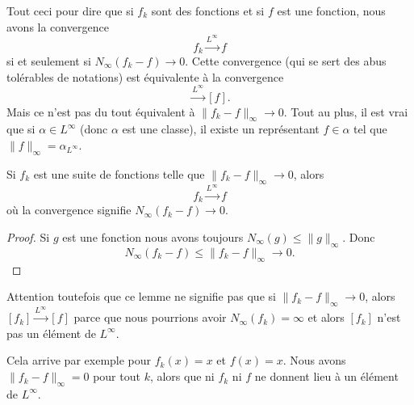 \begin{normaltext}
    Tout ceci pour dire que si \( f_k\) sont des fonctions et si \( f\) est une fonction, nous avons la convergence
    \begin{equation}
        f_k\stackrel{L^{\infty}}{\longrightarrow}f
    \end{equation}
    si et seulement si \( N_{\infty}(f_k-f)\to 0\). Cette convergence (qui se sert des abus tolérables de notations) est équivalente à la convergence
    \begin{equation}
        [f_k]\stackrel{L^{\infty}}{\longrightarrow}[f].
    \end{equation}
    Mais ce n'est pas du tout équivalent à \( \| f_k -f \|_{\infty}\to 0\). Tout au plus, il est vrai que si \( \alpha\in L^{\infty}\) (donc \( \alpha\) est une classe), il existe un représentant \( f\in \alpha\) tel que \( \| f \|_{\infty}=\alpha_{L^{\infty}}\).
\end{normaltext}

\begin{lemma}
    Si \( f_k\) est une suite de fonctions telle que \( \| f_k-f \|_{\infty}\to 0\), alors
    \begin{equation}
        f_k\stackrel{L^{\infty}}{\longrightarrow}f
    \end{equation}
    où la convergence signifie \( N_{\infty}(f_k-f)\to 0\).
\end{lemma}

\begin{proof}
    Si \( g\) est une fonction nous avons toujours \( N_{\infty}(g)\leq \| g \|_{\infty}\). Donc
    \begin{equation}
        N_{\infty}(f_k-f)\leq \| f_k-f \|_{\infty}\to 0.
    \end{equation}
\end{proof}

\begin{normaltext}
    Attention toutefois que ce lemme ne signifie pas que si \( \| f_k-f \|_{\infty}\to 0\), alors \(  [f_k]\stackrel{L^{\infty}}{\longrightarrow}[f]  \) parce que nous pourrions avoir \( N_{\infty}(f_k)=\infty\) et alors \( [f_k]\) n'est pas un élément de \( L^{\infty}\).

    Cela arrive par exemple pour \( f_k(x)=x\) et \( f(x)=x\). Nous avons \( \| f_k-f \|_{\infty}=0\) pour tout \( k\), alors que ni \( f_k\) ni \( f\) ne donnent lieu à un élément de \( L^{\infty}\).
\end{normaltext}

